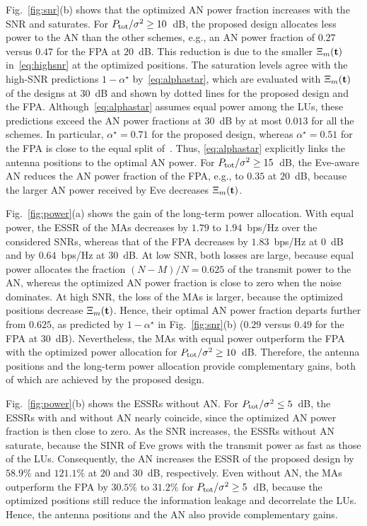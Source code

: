\documentclass[journal]{IEEEtran}
\newcommand{\rev}[1]{{\color{red}#1}}
\newcommand{\rev}[1]{#1}
\begin{document}
Fig.~\ref{fig:snr}(b) shows that the optimized AN power fraction increases with the SNR and saturates. For $P_{\mathrm{tot}}/\sigma^2\ge10$~dB, the proposed design allocates less power to the AN than the other schemes, e.g., an AN power fraction of $0.27$ versus $0.47$ for the FPA at $20$~dB. This reduction is due to the smaller $\Xi_m(\mathbf{t})$ in~\eqref{eq:highsnr} at the optimized positions. The saturation levels agree with the high-SNR \rev{predictions} $1-\alpha^\star$ by~\eqref{eq:alphastar}, which are evaluated with $\Xi_m(\mathbf{t})$ of the designs at $30$~dB and shown by dotted lines for the proposed design and the FPA. Although~\eqref{eq:alphastar} assumes equal power among the LUs, these \rev{predictions} exceed the AN power fractions at $30$~dB by at most $0.013$ for all the schemes. In particular, $\alpha^\star=0.71$ for the proposed design, whereas $\alpha^\star=0.51$ for the FPA is close to the equal split of~\cite{Zhou2010}. Thus, \eqref{eq:alphastar} explicitly links the antenna positions to the optimal AN power. For $P_{\mathrm{tot}}/\sigma^2\ge15$~dB, the Eve-aware AN reduces the AN power fraction of the FPA, e.g., to $0.35$ at $20$~dB, because the larger AN power received by Eve decreases $\Xi_m(\mathbf{t})$.

Fig.~\ref{fig:power}(a) shows the gain of the long-term power allocation. With equal power, the ESSR of the MAs decreases by $1.79$ to $1.94$~bps/Hz over the considered SNRs, whereas that of the FPA decreases by $1.83$~bps/Hz at $0$~dB and by $0.64$~bps/Hz at $30$~dB. At low SNR, both losses are large, because equal power allocates the fraction $(N-M)/N=0.625$ of the transmit power to the AN, whereas the optimized AN power fraction is close to zero when the noise dominates. At high SNR, the loss of the MAs is larger, because the optimized positions decrease $\Xi_m(\mathbf{t})$. Hence, their optimal AN power fraction departs further from $0.625$, as predicted by $1-\alpha^\star$ in Fig.~\ref{fig:snr}(b) ($0.29$ versus $0.49$ for the FPA at $30$~dB). Nevertheless, the MAs with equal power outperform the FPA with the optimized power allocation for $P_{\mathrm{tot}}/\sigma^2\ge10$~dB. Therefore, the antenna positions and the long-term power allocation provide complementary gains, both of which are achieved by the proposed design.

Fig.~\ref{fig:power}(b) shows the ESSRs without AN. For $P_{\mathrm{tot}}/\sigma^2\le5$~dB, the ESSRs with and without AN nearly coincide, since the optimized AN power fraction is then close to zero. As the SNR increases, the ESSRs without AN saturate, because the SINR of Eve grows with the transmit power as fast as those of the LUs. Consequently, the AN increases the ESSR of the proposed design by $58.9\%$ and $121.1\%$ at $20$ and $30$~dB, respectively. Even without AN, the MAs outperform the FPA by $30.5\%$ to $31.2\%$ for $P_{\mathrm{tot}}/\sigma^2\ge5$~dB, because the optimized positions still reduce the information leakage and decorrelate the LUs. Hence, the antenna positions and the AN also provide complementary gains.
\end{document}
